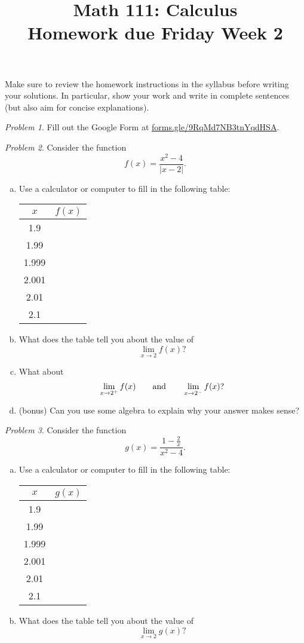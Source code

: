 \documentclass[11pt,twoside]{amsart}
\title{Math 111: Calculus\\ Homework due Friday Week 2}
\theoremstyle{plain}
\theoremstyle{remark}
\newtheorem{prob}{Problem}
\theoremstyle{definition}
\theoremstyle{definition}
\begin{document}
\maketitle

\noindent Make sure to review the homework instructions in the syllabus before writing your solutions. In particular, show your work and write in complete sentences (but also aim for concise explanations).

\begin{prob}
Fill out the Google Form at \href{https://forms.gle/9RqMd7NB3tnYqdHSA}{forms.gle/9RqMd7NB3tnYqdHSA}.
\end{prob}

\begin{prob}
Consider the function
\[
  f(x) = \frac{x^2-4}{|x-2|}.
\]
\begin{enumerate}[(a)]
\item Use a calculator or computer to fill in the following table:
\renewcommand{\arraystretch}{1.3}
\begin{center}
\begin{tabular}{c|c}
$x$ & $f(x)$\\ \hline
1.9 &\\ \hline
1.99 &\\ \hline
1.999 &\\ \hline
2.001 &\\ \hline
2.01 &\\ \hline
2.1
\end{tabular}
\end{center}
\item What does the table tell you about the value of
\[
  \lim_{x\to 2}f(x)\text{?}
\]
\item What about
\[
  \lim_{x\to 2^+}f(x)\qquad\text{and}\qquad \lim_{x\to 2^-}f(x)\text?
\]
\item (bonus) Can you use some algebra to explain why your answer makes sense?
\end{enumerate}
\end{prob}

\begin{prob}
Consider the function
\[
  g(x) = \frac{1-\frac 2x}{x^2-4}.
\]
\begin{enumerate}[(a)]
\item Use a calculator or computer to fill in the following table:
\renewcommand{\arraystretch}{1.3}
\begin{center}
\begin{tabular}{c|c}
$x$ & $g(x)$\\ \hline
1.9 &\\ \hline
1.99 &\\ \hline
1.999 &\\ \hline
2.001 &\\ \hline
2.01 &\\ \hline
2.1
\end{tabular}
\end{center}
\item What does the table tell you about the value of
\[
  \lim_{x\to 2}g(x)\text{?}
\]
\end{enumerate}
\end{prob}
\end{document}
